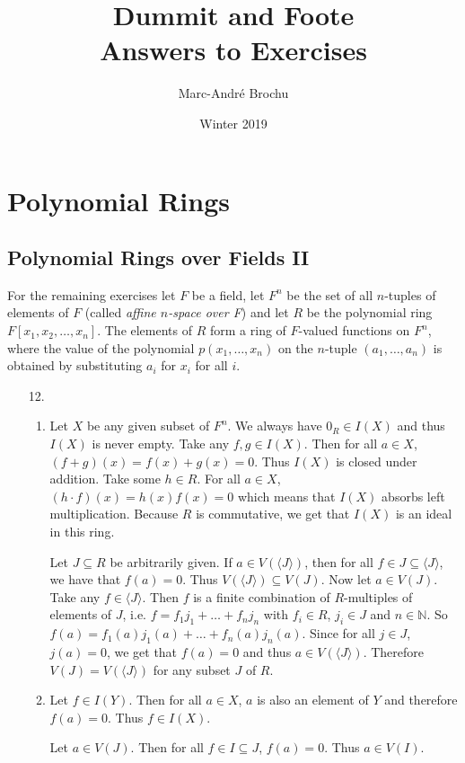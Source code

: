 \documentclass{report}
\begin{document}
\title{Dummit and Foote\\Answers to Exercises}
\author{Marc-André Brochu}
\date{Winter 2019}
\maketitle

\chapter{Polynomial Rings}

\section{Polynomial Rings over Fields II}

For the remaining exercises let $F$ be a field, let $F^n$ be the set of all $n$-tuples of elements of $F$ (called \textit{affine $n$-space over F}) and let $R$ be the polynomial ring $F[x_1,x_2,\dots,x_n]$. The elements of $R$ form a ring of $F$-valued functions on $F^n$, where the value of the polynomial $p(x_1,\dots,x_n)$ on the $n$-tuple $(a_1,\dots,a_n)$ is obtained by substituting $a_i$ for $x_i$ for all $i$.

\begin{enumerate}
\item[12.]
\begin{enumerate}
\item
Let $X$ be any given subset of $F^n$. We always have $0_R\in I(X)$ and thus $I(X)$ is never empty. Take any $f,g\in I(X)$. Then for all $a\in X$, $(f+g)(x) = f(x)+g(x)=0$. Thus $I(X)$ is closed under addition. Take some $h\in R$. For all $a\in X$, $(h\cdot f)(x)=h(x)f(x)=0$ which means that $I(X)$ absorbs left multiplication. Because $R$ is commutative, we get that $I(X)$ is an ideal in this ring.

Let $J\subseteq R$ be arbitrarily given. If $a\in V(\langle J\rangle)$, then for all $f\in J\subseteq \langle J\rangle$, we have that $f(a)=0$. Thus $V(\langle J\rangle)\subseteq V(J)$. Now let $a\in V(J)$. Take any $f\in \langle J\rangle$. Then $f$ is a finite combination of $R$-multiples of elements of $J$, i.e. $f=f_1j_1+\dots+f_nj_n$ with $f_i\in R$, $j_i\in J$ and $n\in \mathbb{N}$. So $f(a) = f_1(a)j_1(a)+\dots+f_n(a)j_n(a)$. Since for all $j\in J$, $j(a)=0$, we get that $f(a)=0$ and thus $a\in V(\langle J\rangle)$. Therefore $V(J)=V(\langle J\rangle)$ for any subset $J$ of $R$.

\item
Let $f\in I(Y)$. Then for all $a\in X$, $a$ is also an element of $Y$ and therefore $f(a)=0$. Thus $f\in I(X)$.

Let $a\in V(J)$. Then for all $f\in I\subseteq J$, $f(a)=0$. Thus $a\in V(I)$.
\end{enumerate}
\end{enumerate}
\end{document}

